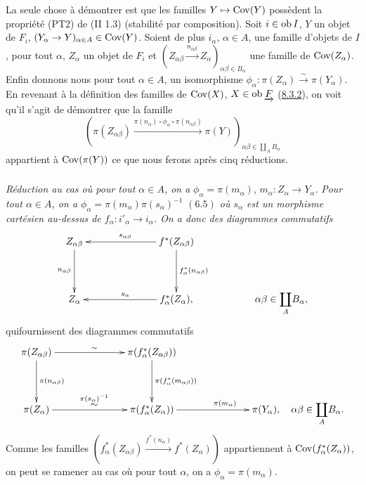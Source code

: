 \documentclass[10pt]{../fichiers-configuration-latex/smfart}
\begin{document}
\subsubsection{}
La seule chose à démontrer est que les familles $Y \mapsto \operatorname{Cov}(Y)$
possèdent la propriété (PT2) de (II 1.3) (stabilité par
composition). Soit $i \in \operatorname{ob} I$, $Y$ un objet de $F_i$, $(Y_\alpha \to
Y)_{\alpha \in A} \in \Cov(Y)$. Soient de plus $i_\alpha$, $\alpha \in
A$, une famille d'objets de $I$, pour tout $\alpha$, $Z_{\alpha}$ un
objet de $F_i$ et $(Z_{\alpha \beta} \xrightarrow{n_{\alpha \beta}}
Z_{\alpha})_{\alpha \beta \in B_{\alpha}}$ une famille de
$\operatorname{Cov}(Z_{\alpha})$. Enfin donnons nous pour tout $\alpha \in A$, un
isomorphisme $\phi_{\alpha} : \pi (Z_{\alpha}) \xrightarrow{\sim} \pi
(Y_{\alpha})$. En revenant à la définition des familles de $\operatorname{Cov}(X)$,
$X \in \operatorname{ob} \underrightarrow{F}$ (\hyperref[VI.subsubsec8.3.2]{8.3.2}), on voit qu'il s'agit de démontrer
que la famille
$$
(\pi (Z_{\alpha \beta}) \xrightarrow{\pi(n_{\alpha}) \circ \phi_{\alpha} \circ
  \pi(n_{\alpha \beta})} \pi(Y))_{\alpha \beta \in \mathop{\coprod}_A
  B_{\alpha}}
$$
appartient à $\operatorname{Cov}(\pi(Y))$ ce que nous ferons après cinq
réductions.

\setcounter{subsubsection}{7}
\subsubsection{}
\emph{Réduction au cas où  pour tout $\alpha \in A$, on a}
$\phi_{\alpha} = \pi(m_{\alpha})$, $m_{\alpha} : Z_{\alpha} \to
Y_{\alpha}$. \emph{Pour tout $\alpha \in A$, on a $\phi_{\alpha} =
\pi(m_{\alpha}) \pi(s_{\alpha})^{-1}$ $(\hyperref[VI.prop6.5]{6.5})$ où $s_{\alpha}$ est un
morphisme cartésien au-dessus de $f_{\alpha} : i'_{\alpha} \to
i_{\alpha}$. On a donc des diagrammes commutatifs}
\[
\xymatrix@C=2.5cm@R=1.25cm{
Z_{\alpha\beta} \ar[d]_{n_{\alpha\beta}} & f^{\ast}(Z_{\alpha\beta})
\ar[l]_{s_{\alpha\beta}} \ar[d]^{f^{\ast}_{\alpha}(n_{\alpha\beta})}\\
Z_{\alpha} &   f^{\ast}_{\alpha}(Z_{\alpha}) \ar[l]_{s_{\alpha}},  &
**[l]\alpha\beta\in \displaystyle{\coprod_A} B_{\alpha},
}
\]
qui\pageoriginale fournissent des diagrammes commutatifs
\[
\xymatrix@C=2.5cm@R=1.25cm@H=.2cm{
\pi(Z_{\alpha\beta})  \ar[r]^{\sim} \ar[d]^{\pi(n_{\alpha\beta})}&
\pi(f^{\ast}_{\alpha}(Z_{\alpha\beta})) \ar[d]^{\pi(f^{\ast}_{\alpha}(m_{\alpha\beta}))}\\
\pi(Z_{\alpha})  \ar[r]^{\displaystyle\mathop{\sim}^{\pi(s_\alpha)^{-1}}} & \pi(f^{\ast}_{\alpha}(Z_{\alpha}))
\ar[r]^{\pi(m_{\alpha})} & \pi(Y_\alpha),\quad
\alpha\beta\in \displaystyle{\coprod_A} B_{\alpha}.}
\]
Comme les familles
$(f^{\ast}_{\alpha}(Z_{\alpha\beta})\xrightarrow{f^{\ast}(n_{\alpha})}
f^{\ast}(Z_{\alpha}))$ appartiennent à
$\operatorname{Cov}(f^{\ast}_{\alpha}(Z_{\alpha}))$, on peut se ramener au cas où
pour tout $\alpha$, on a $\phi_{\alpha} = \pi(m_{\alpha})$.
\end{document}
